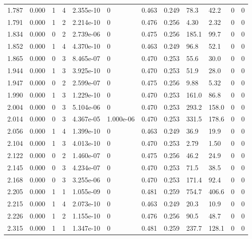 \documentclass[preview]{standalone}
\begin{document}
{{{\begin{tabular}{L{1.2cm}C{1.2cm} C{0.3cm}C{0.5cm} C{1.4cm}C{1.4cm} C{1.4cm}C{1.4cm} C{1.6cm}C{1.6cm} C{1.6cm}C{1.6cm}}
  1.787  &  0.000  & 1     &  4 &  2.355e-10  & 0  &  0.463&   0.249& 78.3 & 42.2   &  0 & 0  \\ 
  1.791  &  0.000  & 1     &  2 &  2.214e-10  & 0  &  0.476&   0.256& 4.30 & 2.32   &  0 & 0  \\ 
  1.834  &  0.000  & 0     &  2 &  2.739e-06  & 0  &  0.475&   0.256& 185.1 & 99.7   &  0 & 0  \\ 
  1.852  &  0.000  & 1     &  4 &  4.370e-10  & 0  &  0.463&   0.249& 96.8 & 52.1   &  0 & 0  \\ 
  1.865  &  0.000  & 0     &  3 &  8.465e-07  & 0  &  0.470&   0.253& 55.6 & 30.0   &  0 & 0  \\ 
  1.944  &  0.000  & 1     &  3 &  3.925e-10  & 0  &  0.470&   0.253& 51.9 & 28.0   &  0 & 0  \\ 
  1.947  &  0.000  & 0     &  2 &  2.599e-07  & 0  &  0.475&   0.256& 9.88 & 5.32   &  0 & 0  \\ 
  1.990  &  0.000  & 1     &  3 &  1.229e-10  & 0  &  0.470&   0.253& 161.0 & 86.8   &  0 & 0  \\ 
  2.004  &  0.000  & 0     &  3 &  5.104e-06  & 0  &  0.470&   0.253& 293.2 & 158.0   &  0 & 0  \\ 
  2.014  &  0.000  & 0     &  3 &  4.367e-05  & 1.000e-06  &  0.470&   0.253& 331.5 & 178.6   &  0 & 0  \\ 
  2.056  &  0.000  & 1     &  4 &  1.399e-10  & 0  &  0.463&   0.249& 36.9 & 19.9   &  0 & 0  \\ 
  2.104  &  0.000  & 1     &  3 &  4.013e-10  & 0  &  0.470&   0.253& 2.79 & 1.50   &  0 & 0  \\ 
  2.122  &  0.000  & 0     &  2 &  1.460e-07  & 0  &  0.475&   0.256& 46.2 & 24.9   &  0 & 0  \\ 
  2.145  &  0.000  & 0     &  3 &  4.234e-07  & 0  &  0.470&   0.253& 71.5 & 38.5   &  0 & 0  \\ 
  2.168  &  0.000  & 0     &  3 &  3.255e-06  & 0  &  0.470&   0.253& 171.4 & 92.4   &  0 & 0  \\ 
  2.205  &  0.000  & 1     &  1 &  1.055e-09  & 0  &  0.481&   0.259& 754.7 & 406.6   &  0 & 0  \\ 
  2.215  &  0.000  & 1     &  4 &  2.073e-10  & 0  &  0.463&   0.249& 20.3 & 10.9   &  0 & 0  \\ 
  2.226  &  0.000  & 1     &  2 &  1.155e-10  & 0  &  0.476&   0.256& 90.5 & 48.7   &  0 & 0  \\ 
  2.315  &  0.000  & 1     &  1 &  1.347e-10  & 0  &  0.481&   0.259& 237.7 & 128.1   &  0 & 0  \\ 

\end{tabular}}}}
\end{document}
